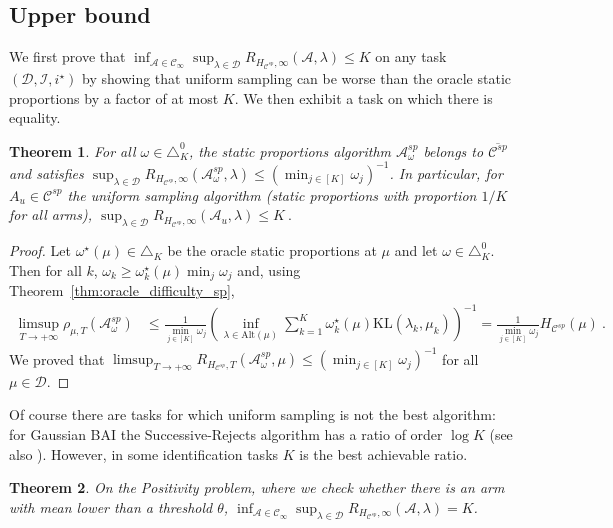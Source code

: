 \documentclass{article}
\newcommand{\KL}{\mathrm{KL}}
\newcommand{\alt}{\mathrm{Alt}}
\newtheorem{theorem}{Theorem}
\begin{document}
\subsection{Upper bound}
\label{sub:upper_bound}

We first prove that $\inf_{\mathcal A \in \mathcal C_\infty} \sup_{\lambda \in \mathcal D}  R_{H_{\mathcal C^{sp}}, \infty}(\mathcal A, \lambda) \le K$ on any task $(\mathcal D, \mathcal I, i^\star)$ by showing that uniform sampling can be worse than the oracle static proportions by a factor of at most $K$. We then exhibit a task on which there is equality.

\begin{theorem}\label{thm:uniform_upper_bound}
For all $\omega \in \triangle_K^0$, the static proportions algorithm $\mathcal A_\omega^{sp}$ belongs to $\overline{\mathcal C^{sp}}$ and satisfies $\sup_{\lambda\in \mathcal D} R_{H_{\mathcal C^{sp}}, \infty}(\mathcal A_\omega^{sp}, \lambda) \le (\min_{j \in [K]} \omega_j)^{-1}$. In particular, for $A_u \in \mathcal C^{sp}$ the uniform sampling algorithm (static proportions with proportion $1/K$ for all arms),
$
\sup_{\lambda\in \mathcal D} R_{H_{\mathcal C^{sp}}, \infty}(\mathcal A_u, \lambda) \le K \: .
$
\end{theorem}
\begin{proof}
Let $\omega^\star(\mu) \in \triangle_K$ be the oracle static proportions at $\mu$ and let $\omega \in \triangle_K^0$. Then for all $k$, $\omega_k \ge \omega^\star_k(\mu) \min_j \omega_j$ and, using Theorem~\ref{thm:oracle_difficulty_sp},
\begin{align*}
\limsup_{T \to +\infty} \rho_{\mu, T}(\mathcal A_\omega^{sp})
&\le \frac{1}{\min_{j \in [K]} \omega_j}\left( \inf_{\lambda \in \alt(\mu)} \sum_{k=1}^K \omega_k^\star(\mu) \KL(\lambda_k, \mu_k) \right)^{-1}
= \frac{1}{\min_{j \in [K]} \omega_j} H_{\mathcal C^{sp}}(\mu)
\: .
\end{align*}
We proved that $\limsup_{T \to +\infty} R_{H_{\mathcal C^{sp}}, T}(\mathcal A_\omega^{sp}, \mu) \le (\min_{j \in [K]} \omega_j)^{-1}$ for all $\mu \in \mathcal D$.
\end{proof}

Of course there are tasks for which uniform sampling is not the best algorithm: for Gaussian BAI the Successive-Rejects algorithm \cite{audibert2010best} has a ratio of order $\log K$ (see also \cite{barrier2022best}). However, in some identification tasks $K$ is the best achievable ratio.


\begin{theorem}\label{thm:positivity_LB}
On the Positivity problem, where we check whether there is an arm with mean lower than a threshold $\theta$, $\inf_{\mathcal A \in \mathcal C_\infty} \sup_{\lambda \in \mathcal D}  R_{H_{\mathcal C^{sp}}, \infty}(\mathcal A, \lambda) = K$.
\end{theorem}
\end{document}
